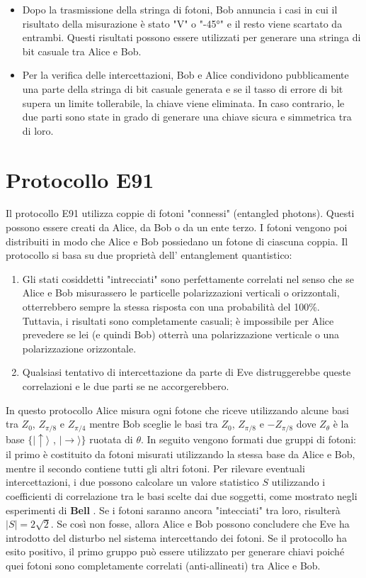 \begin{itemize}
    \item Dopo la trasmissione della stringa di fotoni, Bob annuncia i casi in cui il risultato della misurazione è stato "V" o "-45°" e il resto viene scartato da entrambi. Questi risultati possono essere utilizzati per generare una stringa di bit casuale tra Alice e Bob.
    
    \item Per la verifica delle intercettazioni, Bob e Alice condividono pubblicamente una parte della stringa di bit casuale generata e se il tasso di errore di bit supera un limite tollerabile, la chiave viene eliminata. In caso contrario, le due parti sono state in grado di generare una chiave sicura e simmetrica tra di loro.
\end{itemize}
\newpage
\section{Protocollo E91}
Il protocollo E91 utilizza coppie di fotoni "connessi" (entangled photons). Questi possono essere creati da Alice, da Bob o da un ente terzo. I fotoni vengono poi distribuiti in modo che Alice e Bob possiedano un fotone di ciascuna coppia. Il protocollo si basa su due proprietà dell' entanglement quantistico:
\begin{enumerate}
    \item Gli stati cosiddetti "intrecciati" sono perfettamente correlati nel senso che se Alice e Bob misurassero le particelle polarizzazioni verticali o orizzontali, otterrebbero sempre la stessa risposta con una probabilità del 100\%. Tuttavia, i risultati sono completamente casuali; è impossibile per Alice prevedere se lei (e quindi Bob) otterrà una polarizzazione verticale o una polarizzazione orizzontale. 
    \item Qualsiasi tentativo di intercettazione da parte di Eve distruggerebbe queste correlazioni e le due parti se ne accorgerebbero.
\end{enumerate}
In questo protocollo Alice misura ogni fotone che riceve utilizzando alcune basi tra $Z_0$, $Z_{\pi/8}$ e $Z_{\pi/4}$ mentre Bob sceglie le basi tra $Z_0$, $Z_{\pi/8}$ e $-Z_{\pi/8}$ dove $Z_{\theta}$ è la base $\{|\uparrow\rangle$ , $|\rightarrow\rangle\}$ ruotata di $\theta$. 
In seguito vengono formati due gruppi di fotoni: il primo è costituito da fotoni misurati utilizzando la stessa base da Alice e Bob, mentre il secondo contiene tutti gli altri fotoni. Per rilevare eventuali intercettazioni, i due possono calcolare un valore statistico $S$ utilizzando i coefficienti di correlazione tra le basi scelte dai due soggetti, come mostrato negli esperimenti di \textbf{Bell} \cite{noauthor_bell_2022}. Se i fotoni saranno ancora "intecciati" tra loro, risulterà $|S| = 2\sqrt{2}$. Se così non fosse, allora Alice e Bob possono concludere che Eve ha introdotto del disturbo nel sistema intercettando dei fotoni. Se il protocollo ha esito positivo, il primo gruppo può essere utilizzato per generare chiavi poiché quei fotoni sono completamente correlati (anti-allineati) tra Alice e Bob.

